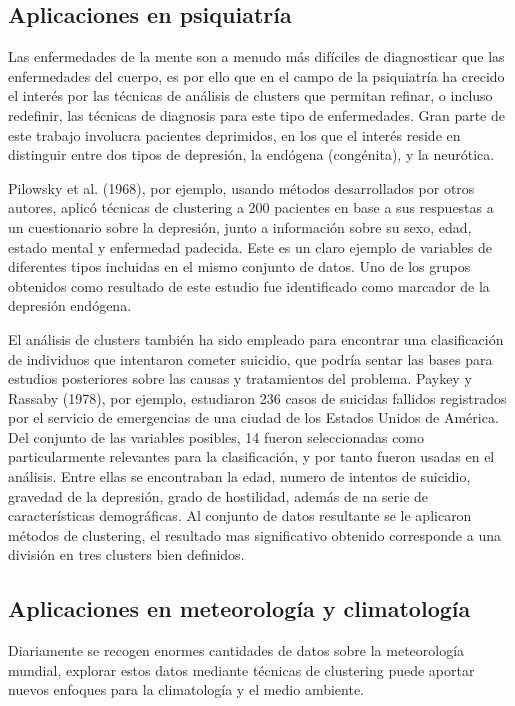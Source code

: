 \subsection{Aplicaciones en psiquiatría}

Las enfermedades de la mente son a menudo más difíciles de diagnosticar que las enfermedades del cuerpo, es por ello que en el campo de la psiquiatría ha crecido el interés por las técnicas de análisis de clusters que permitan refinar, o incluso redefinir, las técnicas de diagnosis para este tipo de enfermedades. Gran parte de este trabajo involucra pacientes deprimidos, en los que el interés reside en distinguir entre dos tipos de depresión, la endógena (congénita), y la neurótica.

Pilowsky et al. (1968), por ejemplo, usando métodos desarrollados por otros autores, aplicó técnicas de clustering a 200 pacientes en base a sus respuestas a un cuestionario sobre la depresión, junto a información sobre su sexo, edad, estado mental y enfermedad padecida. Este es un claro ejemplo de variables de diferentes tipos incluidas en el mismo conjunto de datos. Uno de los grupos obtenidos como resultado de este estudio fue identificado como marcador de la depresión endógena.

El análisis de clusters también ha sido empleado para encontrar una clasificación de individuos que intentaron cometer suicidio, que podría sentar las bases para estudios posteriores sobre las causas y tratamientos del problema. Paykey y Rassaby (1978), por ejemplo, estudiaron 236 casos de suicidas fallidos registrados por el servicio de emergencias de una ciudad de los Estados Unidos de América. Del conjunto de las variables posibles, 14 fueron seleccionadas como particularmente relevantes para la clasificación, y por tanto fueron usadas en el análisis. Entre ellas se encontraban la edad, numero de intentos de suicidio, gravedad de la depresión, grado de hostilidad, además de na serie de características demográficas. Al conjunto de datos resultante se le aplicaron métodos de clustering, el resultado mas significativo obtenido corresponde a una división en tres clusters bien definidos.

\subsection{Aplicaciones en meteorología y climatología}

Diariamente se recogen enormes cantidades de datos sobre la meteorología mundial, explorar estos datos mediante técnicas de clustering puede aportar nuevos enfoques para la climatología y el medio ambiente.

